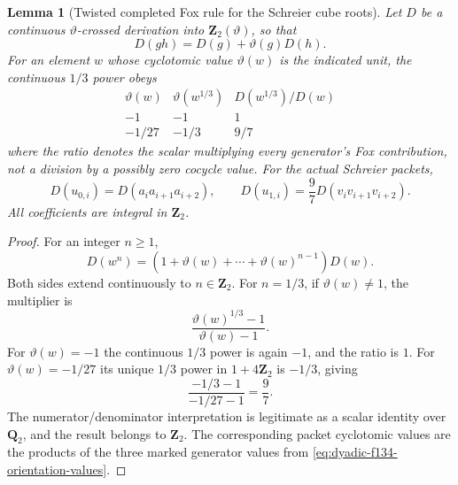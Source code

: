 \documentclass[11pt]{article}
\newtheorem{lemma}[theorem]{Lemma}
\theoremstyle{definition}
\begin{document}
\begin{lemma}[Twisted completed Fox rule for the Schreier cube roots]
\label{lem:dyadic-f134-twisted-cubic-fox}
Let $D$ be a continuous
$\vartheta$-crossed
derivation into
$\mathbf Z_2(\vartheta)$,
so that
\[
D(gh)=D(g)+\vartheta(g)D(h).
\]
For an element $w$
whose cyclotomic
value $\vartheta(w)$
is the indicated
unit, the continuous
$1/3$ power obeys
\begin{equation}\label{eq:dyadic-f134-cuberoot-fox-factors}
\boxed{
\begin{array}{c|c|c}
\vartheta(w)&\vartheta(w^{1/3})&
D(w^{1/3})/D(w)\\ \hline
-1&-1&1\\
-1/27&-1/3&9/7
\end{array}}
\end{equation}
where the ratio denotes
the scalar multiplying
\emph{every} generator's
Fox contribution, not a
division by a possibly
zero cocycle value.
For the actual
Schreier packets,
\[
D(u_{0,i})=D(a_i a_{i+1}a_{i+2}),\qquad
D(u_{1,i})=
\frac97D(v_i v_{i+1}v_{i+2}).
\]
All coefficients are
integral in $\mathbf Z_2$.
\end{lemma}

\begin{proof}
For an integer $n\ge1$,
\[
D(w^n)=
(1+\vartheta(w)+\cdots+
\vartheta(w)^{n-1})D(w).
\]
Both sides extend
continuously to
$n\in\mathbf Z_2$.
For $n=1/3$, if
$\vartheta(w)\ne1$,
the multiplier is
\[
\frac{\vartheta(w)^{1/3}-1}
{\vartheta(w)-1}.
\]
For $\vartheta(w)=-1$
the continuous $1/3$ power
is again $-1$,
and the ratio is $1$.
For $\vartheta(w)=-1/27$
its unique $1/3$ power
in $1+4\mathbf Z_2$
is $-1/3$, giving
\[
\frac{-1/3-1}{-1/27-1}
=\frac97.
\]
The numerator/denominator
interpretation is legitimate
as a scalar identity
over $\mathbf Q_2$, and
the result belongs to
$\mathbf Z_2$.
The corresponding
packet cyclotomic values
are the products of the
three marked generator
values from
\eqref{eq:dyadic-f134-orientation-values}.
\end{proof}
\end{document}
